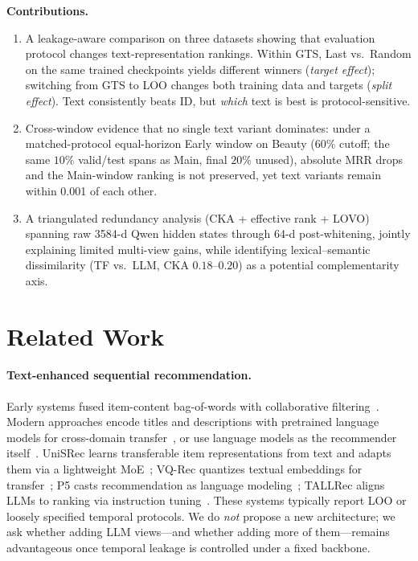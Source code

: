 \documentclass[sigconf,natbib=true,anonymous]{acmart}
\begin{document}
\medskip
\noindent\textbf{Contributions.}
\nopagebreak
\begin{enumerate}[leftmargin=*,itemsep=1pt,topsep=4pt]
\item A leakage-aware comparison on three datasets showing that evaluation protocol changes text-representation rankings.  Within GTS, Last vs.\ Random on the same trained checkpoints yields different winners (\emph{target effect}); switching from GTS to LOO changes both training data and targets (\emph{split effect}).  Text consistently beats ID, but \emph{which} text is best is protocol-\hspace{0pt}sensitive.
\item Cross-window evidence that no single text variant dominates: under a matched-protocol equal-horizon Early window on Beauty ($60\%$ cutoff; the same $10\%$ valid/\hspace{0pt}test spans as Main, final $20\%$ unused), absolute MRR drops and the Main-window ranking is not preserved, yet text variants remain within 0.001 of each other.
\item A triangulated redundancy analysis (CKA + effective rank + LOVO) spanning raw 3584-d Qwen hidden states through 64-d post-whitening, jointly explaining limited multi-view gains, while identifying lexical--semantic dissimilarity (TF vs.\ LLM, CKA $0.18$--$0.20$) as a potential complementarity axis.
\end{enumerate}

\section{Related Work}
\label{sec:related}

\paragraph{Text-enhanced sequential recommendation.}
Early systems fused item-content bag-of-words with collaborative filtering~\cite{wang2015cdl}.
Modern approaches encode titles and descriptions with pretrained language models for cross-domain transfer~\cite{hou2022unisrec,hou2023vqrec}, or use language models as the recommender itself~\cite{geng2022p5,bao2023tallrec}.
UniSRec learns transferable item representations from text and adapts them via a lightweight MoE~\cite{hou2022unisrec}; VQ-Rec quantizes textual embeddings for transfer~\cite{hou2023vqrec}; P5 casts recommendation as language modeling~\cite{geng2022p5}; TALLRec aligns LLMs to ranking via instruction tuning~\cite{bao2023tallrec}.
These systems typically report LOO or loosely specified temporal protocols.
We do \emph{not} propose a new architecture; we ask whether adding LLM views---and whether adding more of them---remains advantageous once temporal leakage is controlled under a fixed backbone.
\end{document}
